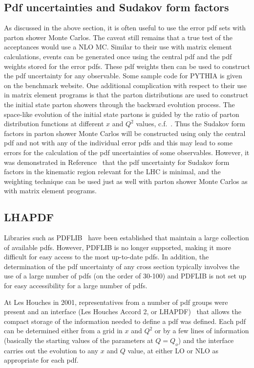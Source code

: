 \documentclass[12pt]{iopart}
\begin{document}
\subsection{Pdf uncertainties and Sudakov form factors}
\label{sec:pdfsud}

As discussed in the above section, it is often useful to use the error pdf sets with parton shower Monte Carlos.
The caveat still remains that a true test of the acceptances would use a NLO MC.
Similar to their use with matrix element calculations,  events can be
generated once  using the central pdf and the pdf  weights stored for the error pdfs. These pdf weights then can be used to
construct  the pdf uncertainty for any  observable. Some sample code for PYTHIA is given on the benchmark website.  One
additional  complication with respect to  their use in matrix  element programs is that the  parton distributions are used to
construct the initial state parton showers through  the  backward evolution process. The space-like evolution of the initial
state partons  is guided by the ratio of parton distribution functions at different $x$ and $Q^2$ values,
c.f.~. Thus the Sudakov form
factors in parton shower Monte Carlos will be constructed using only  the central pdf and not with any of the individual error
pdfs and  this may lead  to some   errors for  the calculation of the pdf uncertainties of some observables.  However, it was 
demonstrated in Reference~\cite{Gieseke:2004tc} that the pdf uncertainty for Sudakov form factors in the  kinematic region
relevant for the LHC is minimal, and the weighting technique can be  used  just as well with parton shower Monte Carlos as with
matrix element  programs. 

\subsection{LHAPDF}
\label{sec:LHAPDF}

Libraries such as PDFLIB~\cite{Plothow-Besch:1995ci} have been established that maintain a large collection of available pdfs.
However, PDFLIB is no longer supported, making it more difficult for easy access to the most up-to-date pdfs. In addition, the
determination of the pdf uncertainty of any cross section typically involves the use of a large number of pdfs (on the order of
30-100) and PDFLIB is not set up for easy accessibility for a large number of pdfs. 

At Les Houches in 2001, representatives from a number of pdf groups were present and an interface (Les Houches Accord 2, or
LHAPDF)~\cite{Giele:2002hx} that allows the compact storage of the information needed to define a pdf was defined. Each pdf can
be determined either from a grid in $x$ and $Q^2$ or by a few lines of information (basically the starting values of the
parameters at $Q=Q_o$) and the interface carries out the evolution to any $x$ and $Q$ value, at either LO or NLO as appropriate
for each pdf. 
\end{document}
